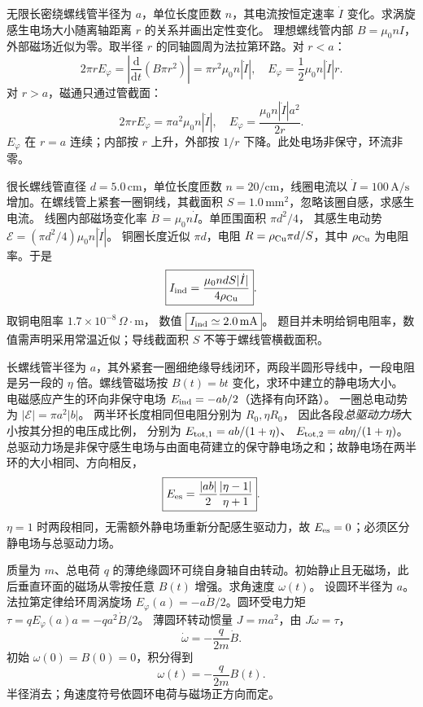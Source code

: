 无限长密绕螺线管半径为 $a$，单位长度匝数 $n$，其电流按恒定速率 $\dot I$ 变化。求涡旋感生电场大小随离轴距离 $r$ 的关系并画出定性变化。
\exsolution
理想螺线管内部 $B=\mu_0nI$，外部磁场近似为零。取半径 $r$ 的同轴圆周为法拉第环路。对 $r<a$：
\[
2\pi rE_\varphi=\left|\frac{\mathrm d}{\mathrm dt}(B\pi r^2)\right|
=\pi r^2\mu_0n|\dot I|,
\quad \boxed{E_\varphi=\frac12\mu_0n|\dot I|r}.
\]
对 $r>a$，磁通只通过管截面：
\[
2\pi rE_\varphi=\pi a^2\mu_0n|\dot I|,
\quad\boxed{E_\varphi=\frac{\mu_0n|\dot I|a^2}{2r}}.
\]
\excheck $E_\varphi$ 在 $r=a$ 连续；内部按 $r$ 上升，外部按 $1/r$ 下降。此处电场非保守，环流非零。

很长螺线管直径 $d=5.0\,\mathrm{cm}$，单位长度匝数 $n=20/\mathrm{cm}$，线圈电流以 $\dot I=100\,\mathrm{A/s}$ 增加。在螺线管上紧套一圈铜线，其截面积 $S=1.0\,\mathrm{mm^2}$，忽略该圈自感，求感生电流。
\exsolution
线圈内部磁场变化率
$\dot B=\mu_0n\dot I$。单匝围面积 $\pi d^2/4$，
其感生电动势
$\mathcal E=(\pi d^2/4)\mu_0n|\dot I|$。
铜圈长度近似 $\pi d$，电阻
$R=\rho_{\rm Cu}\pi d/S$，其中 $\rho_{\rm Cu}$ 为电阻率。于是
\[
\boxed{I_{\rm ind}=\frac{\mu_0ndS|\dot I|}{4\rho_{\rm Cu}}}.
\]
取铜电阻率 $1.7\times10^{-8}\,\Omega\cdot\mathrm m$，
数值 $\boxed{I_{\rm ind}\simeq2.0\,\mathrm{mA}}$。
\excheck 题目并未明给铜电阻率，数值需声明采用常温近似；导线截面积 $S$ 不等于螺线管横截面积。

长螺线管半径为 $a$，其外紧套一圈细绝缘导线闭环，两段半圆形导线中，一段电阻是另一段的 $\eta$ 倍。螺线管磁场按 $B(t)=bt$ 变化，求环中建立的静电场大小。
\exsolution
电磁感应产生的环向非保守电场
$E_{\rm ind}=-ab/2$（选择有向环路）。
一圈总电动势为 $|\mathcal E|=\pi a^2|b|$。
两半环长度相同但电阻分别为 $R_0,\eta R_0$，
因此各段\emph{总驱动力场}大小按其分担的电压成比例，
分别为
$E_{{\rm tot},1}=ab/(1+\eta)$、
$E_{{\rm tot},2}=ab\eta/(1+\eta)$。
总驱动力场是非保守感生电场与由面电荷建立的保守静电场之和；故静电场在两半环的大小相同、方向相反，
\[
\boxed{E_{\rm es}=\frac{|ab|}{2}
\frac{|\eta-1|}{\eta+1}}.
\]
\excheck $\eta=1$ 时两段相同，无需额外静电场重新分配感生驱动力，故 $E_{\rm es}=0$；必须区分静电场与总驱动力场。

质量为 $m$、总电荷 $q$ 的薄绝缘圆环可绕自身轴自由转动。初始静止且无磁场，此后垂直环面的磁场从零按任意 $B(t)$ 增强。求角速度 $\omega(t)$。
\exsolution
设圆环半径为 $a$。法拉第定律给环周涡旋场
$E_\varphi(a)=-a\dot B/2$。圆环受电力矩
$\tau=qE_\varphi(a)a=-qa^2\dot B/2$。
薄圆环转动惯量 $J=ma^2$，由
$J\dot\omega=\tau$，
\[
\dot\omega=-\frac q{2m}\dot B.
\]
初始 $\omega(0)=B(0)=0$，积分得到
\[
\boxed{\omega(t)=-\frac q{2m}B(t)}.
\]
\excheck 半径消去；角速度符号依圆环电荷与磁场正方向而定。

